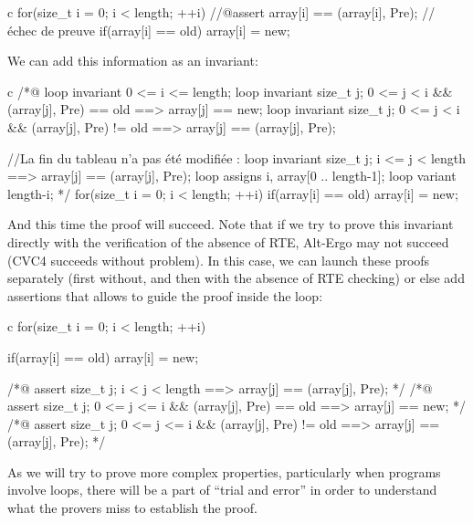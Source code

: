 \documentclass[middle]{zmdocument}
\begin{document}
\begin{CodeBlock}{c}
for(size_t i = 0; i < length; ++i){
    //@assert array[i] == \at(array[i], Pre); // échec de preuve
    if(array[i] == old) array[i] = new;
}
\end{CodeBlock}



We can add this information as an invariant:



\begin{CodeBlock}{c}
/*@
  loop invariant 0 <= i <= length;
  loop invariant \forall size_t j; 0 <= j < i && \at(array[j], Pre) == old 
                   ==> array[j] == new;
  loop invariant \forall size_t j; 0 <= j < i && \at(array[j], Pre) != old 
                   ==> array[j] == \at(array[j], Pre);

  //La fin du tableau n'a pas été modifiée :
  loop invariant \forall size_t j; i <= j < length
                     ==> array[j] == \at(array[j], Pre);
  loop assigns i, array[0 .. length-1];
  loop variant length-i;
*/
for(size_t i = 0; i < length; ++i){
  if(array[i] == old) array[i] = new;
}
\end{CodeBlock}



And this time the proof will succeed. Note that if we try to prove this
invariant directly with the verification of the absence of RTE, Alt-Ergo
may not succeed (CVC4 succeeds without problem). In this case, we can
launch these proofs separately (first without, and then with the absence
of RTE checking) or else add assertions that allows to guide the proof
inside the loop:



\begin{CodeBlock}{c}
for(size_t i = 0; i < length; ++i){
  if(array[i] == old) array[i] = new;

  /*@ assert \forall size_t j; i < j < length 
               ==> array[j] == \at(array[j], Pre);                      */
  /*@ assert \forall size_t j; 0 <= j <= i && \at(array[j], Pre) == old 
               ==> array[j] == new;                                     */
  /*@ assert \forall size_t j; 0 <= j <= i && \at(array[j], Pre) != old 
               ==> array[j] == \at(array[j], Pre);                      */    
}
\end{CodeBlock}



As we will try to prove more complex properties, particularly when
programs involve loops, there will be a part of ``trial and error'' in
order to understand what the provers miss to establish the proof.
\end{document}
